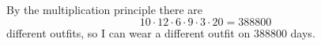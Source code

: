 By the multiplication principle there are
\[10\cdot12\cdot6\cdot9\cdot3\cdot20=\boxed{388800}\]
different outfits, so I can wear a different outfit on $388800$ days.
